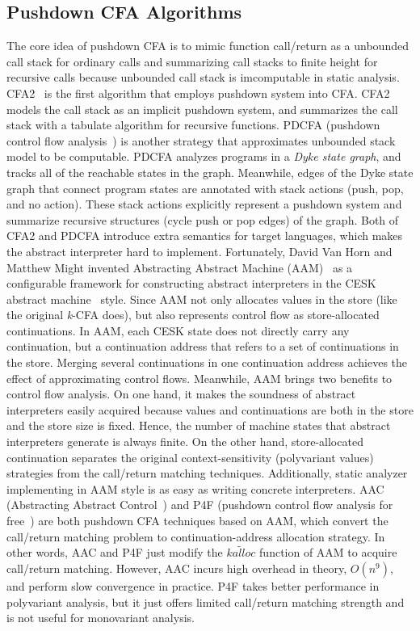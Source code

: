 \documentclass{article}
\begin{document}
\subsection{Pushdown CFA Algorithms}
The core idea of pushdown CFA is to mimic function call/return as a unbounded call stack for ordinary calls and summarizing call stacks to finite height for recursive calls because unbounded call stack is imcomputable in static analysis.
CFA2~\cite{vardoulakis2010cfa2} is the first algorithm that employs pushdown system into CFA\@.
CFA2 models the call stack as an implicit pushdown system, and summarizes the call stack with a tabulate algorithm for recursive functions.
PDCFA (pushdown control flow analysis~\cite{earl2010pushdown})
is another strategy that approximates unbounded stack model to be computable.
PDCFA analyzes programs in a \emph{Dyke state graph}, and tracks all of the reachable states in the graph.
Meanwhile, edges of the Dyke state graph that connect program states are annotated with stack actions (push, pop, and no action).
These stack actions explicitly represent a pushdown system and summarize recursive structures (cycle push or pop edges) of the graph.
Both of CFA2 and PDCFA introduce extra semantics for target languages, which makes the abstract interpreter hard to implement.
Fortunately, David Van Horn and Matthew Might
invented Abstracting Abstract Machine (AAM)~\cite{van2010abstracting}
as a configurable framework for constructing abstract interpreters in the CESK abstract machine~\cite{felleisen1987calculus} style.
Since AAM not only allocates values in the store (like the original \textit{k}-CFA does), but also represents control flow as store-allocated continuations.
In AAM, each CESK state does not directly carry any continuation, but a continuation address that refers to a set of continuations in the store.
Merging several continuations in one continuation address achieves the effect of approximating control flows.
Meanwhile, AAM brings two benefits to control flow analysis.
On one hand, it makes the soundness of abstract interpreters easily acquired because values and continuations are both in the store and
the store size is fixed.
Hence, the number of machine states that abstract interpreters generate is always finite.
On the other hand, store-allocated continuation separates the original context-sensitivity (polyvariant values) strategies from
the call/return matching techniques.
Additionally, static analyzer implementing in AAM style is as easy as writing concrete interpreters.
AAC (Abstracting Abstract Control~\cite{johnson2015abstracting}) and P4F (pushdown control flow analysis for free~\cite{gilray2016pushdown})
are both pushdown CFA techniques based on AAM\@, which convert the call/return matching problem to continuation-address allocation strategy.
In other words, AAC and P4F just modify the $\widetilde{kalloc}$ function of AAM to acquire call/return matching.
However, AAC incurs high overhead in theory, $O(n^9)$, and perform slow convergence in practice. %
P4F takes better performance in polyvariant analysis, but it just offers limited call/return matching strength and is not useful for monovariant analysis.
\end{document}

